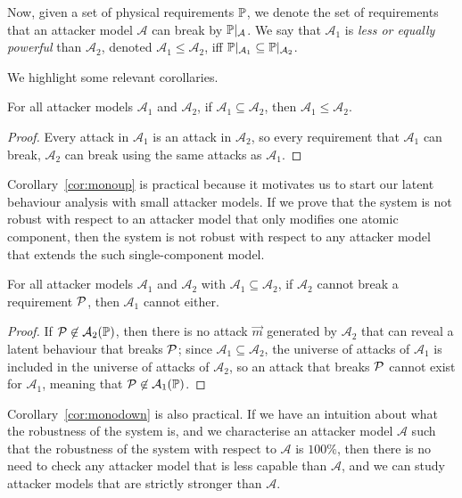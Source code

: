 {\begin{definition}[Capabilities and Power]
  Now, given a set of physical requirements $\mathbb{P}$, we denote the set of requirements that an attacker model $\mathcal{A}$ can break by $\mathbb{P}|_{\mathcal{A}}$. We say that $\mathcal{A}_1$ is \emph{less or equally {powerful}} than $\mathcal{A}_2$, denoted $\mathcal{A}_1\leq \mathcal{A}_2$, iff $\mathbb{P}|_{\mathcal{A}_1}\subseteq\mathbb{P}|_{\mathcal{A}_2}$. 
\end{definition}
We highlight some relevant corollaries.
\begin{corollary}
  \label{cor:monoup}
  For all attacker models $\mathcal{A}_1$ and $\mathcal{A}_2$, if $\mathcal{A}_1\subseteq \mathcal{A}_2$, then $\mathcal{A}_1 \leq \mathcal{A}_2$. 
\end{corollary}
\begin{proof}
  Every attack in $\mathcal{A}_1$ is an attack in $\mathcal{A}_2$, so every requirement that $\mathcal{A}_1$ can break, $\mathcal{A}_2$ can break using the same attacks as $\mathcal{A}_1$.
\end{proof}
Corollary~\ref{cor:monoup} is practical because it motivates us to start our latent behaviour analysis with small attacker models. If we prove that the system is not robust with respect to an attacker model that only modifies one atomic component, then the system is not robust with respect to any attacker model that extends the such single-component model.

\begin{corollary}
  \label{cor:monodown}
  For all attacker models $\mathcal{A}_1$ and $\mathcal{A}_2$ with $\mathcal{A}_1\subseteq \mathcal{A}_2$, if $\mathcal{A}_2$ cannot break a requirement $\mathcal{P}$, then $\mathcal{A}_1$ cannot either.
  \end{corollary}
  \begin{proof}
  If $\mathcal{P}\not\in\mathcal{A}_2(\mathbb{P})$, then there is no attack $\vec{m}$ generated by $\mathcal{A}_2$ that can reveal a latent behaviour that breaks $\mathcal{P}$; since $\mathcal{A}_1\subseteq \mathcal{A}_2$, the universe of attacks of $\mathcal{A}_1$ is included in the universe of attacks of $\mathcal{A}_2$, so an attack that breaks $\mathcal{P}$ cannot exist for $\mathcal{A}_1$, meaning that $\mathcal{P}\not\in\mathcal{A}_1(\mathbb{P})$.
  \end{proof}
  Corollary~\ref{cor:monodown} is also practical. If we have an intuition about what the robustness of the system is, and we characterise an attacker model $\mathcal{A}$ such that the robustness of the system with respect to $\mathcal{A}$ is $100\%$, then there is no need to check any attacker model that is less capable than $\mathcal{A}$, and we can study attacker models that are strictly stronger than $\mathcal{A}$.

}
